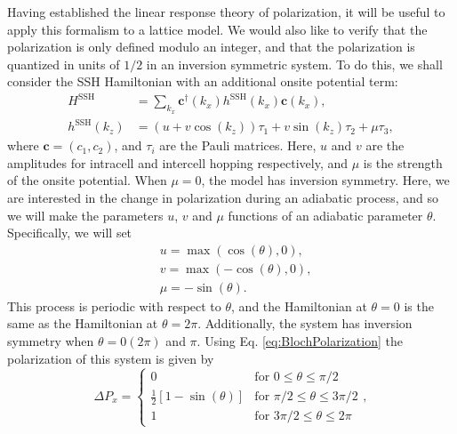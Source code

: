 \documentclass[prb,aps,twocolumn,groupaddress,floatfix]{revtex4-1}
\begin{document}
Having established the linear response theory of polarization, it will be useful to apply this formalism to a lattice model. We would also like to verify that the polarization is only defined modulo an integer, and that the polarization is quantized in units of $1/2$ in an inversion symmetric system. To do this, we shall consider the SSH Hamiltonian with an additional onsite potential term:
\begin{equation}
\begin{split}
H^{\text{SSH}} &= \sum_{k_x} \bm{c}^\dagger(k_x) h^{\text{SSH}}(k_x) \bm{c}(k_x),\\
h^{\text{SSH}}(k_z) &= (u + v\cos(k_z))\tau_1 + v\sin(k_z)\tau_2 + \mu \tau_3,
\end{split}\label{eq:SSHHam}
\end{equation} where $\bm{c} = (c_1,c_2)$, and $\tau_i$ are the Pauli matrices. Here, $u$ and $v$ are the amplitudes for intracell and intercell hopping respectively, and $\mu$ is the strength of the onsite potential. When $\mu = 0$, the model has inversion symmetry. Here, we are interested in the change in polarization during an adiabatic process, and so we will make the parameters $u$, $v$ and $\mu$ functions of an adiabatic parameter $\theta$. Specifically, we will set
\begin{equation}
\begin{split}
&u = \max(\cos(\theta),0),\\
& v = \max(-\cos(\theta),0),\\
&\mu = -\sin(\theta).\label{eq:PolParameters}
\end{split}
\end{equation}
This process is periodic with respect to $\theta$, and the Hamiltonian at $\theta = 0$ is the same as the Hamiltonian at $\theta = 2\pi$. Additionally, the system has inversion symmetry when $\theta = 0(2\pi)$ and $\pi$. Using Eq. \ref{eq:BlochPolarization} the polarization of this system is given by
\begin{equation}
\Delta P_x = 
\begin{cases}
    0 & \text{for } 0 \leq \theta  \leq \pi/2\\
    \frac{1}{2}[1-\sin(\theta)] & \text{for } \pi/2 \leq \theta  \leq 3 \pi/2\\
    1 & \text{for } 3\pi/2 \leq \theta  \leq 2\pi
\end{cases},\label{eq:PValues}
\end{equation}
\end{document}
